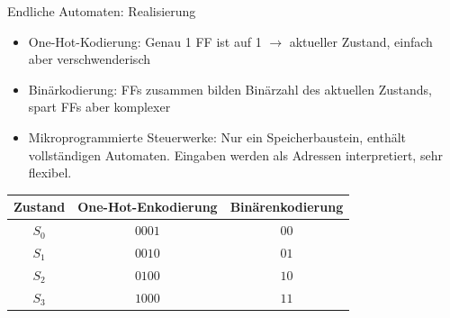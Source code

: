 \documentclass[
  german,            %
  aspectratio=169,    %
]{tumbeamer}
\begin{document}
\begin{frame}[fragile, c]{Endliche Automaten: Realisierung}{}
	\begin{itemize}
		\item One-Hot-Kodierung: Genau 1 FF ist auf 1 $\rightarrow$ aktueller Zustand, einfach aber verschwenderisch
		\item Binärkodierung: FFs zusammen bilden Binärzahl des aktuellen Zustands, spart FFs aber komplexer
		\item Mikroprogrammierte Steuerwerke: Nur ein Speicherbaustein, enthält vollständigen Automaten. Eingaben werden als Adressen interpretiert, sehr flexibel.
	\end{itemize}
	\begin{table}[]
		\begin{tabular}{c|c|c}
			Zustand & One-Hot-Enkodierung & Binärenkodierung \\ \hline
			$S_0$   & $0001$              & $00$             \\
			$S_1$   & $0010$              & $01$             \\
			$S_2$   & $0100$              & $10$             \\
			$S_3$   & $1000$              & $11$
		\end{tabular}
	\end{table}
\end{frame}
\end{document}

